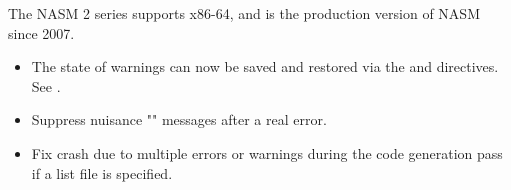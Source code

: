 %
%


The NASM 2 series supports x86-64, and is the production version of NASM
since 2007.


\begin{itemize}
    \item{The state of warnings can now be saved and restored via
        the  and  directives.
        See }.
\end{itemize}


\begin{itemize}
    \item{Suppress nuisance "" messages after a real error.}
\end{itemize}


\begin{itemize}
    \item{Fix crash due to multiple errors or warnings during the code
        generation pass if a list file is specified.}
\end{itemize}


